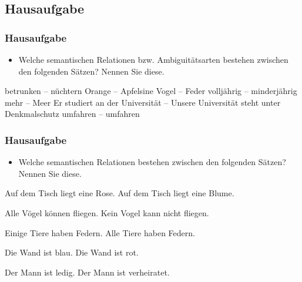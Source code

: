 %
\subsection{Hausaufgabe}
%



\begin{frame}
\frametitle{Hausaufgabe}

\begin{itemize}
	\item Welche semantischen Relationen bzw. Ambiguitätsarten bestehen zwischen den folgenden Sätzen? Nennen Sie diese.
\end{itemize}

\ea 
\ea \label{ex:07HA1} betrunken -- nüchtern
\ex \label{ex:07HA2} Orange -- Apfelsine
\ex \label{ex:07HA3} Vogel -- Feder
\ex \label{ex:07HA4} volljährig -- minderjährig
\ex \label{ex:07HA5} mehr -- Meer
\ex \label{ex:07HA12} Er studiert an der Universität -- Unsere Universität steht unter Denkmalschutz
\ex \label{ex:07HA13} umfahren -- umfahren
\z 	
\z 
\end{frame}



\begin{frame}
\frametitle{Hausaufgabe}

\begin{itemize}
	\item Welche semantischen Relationen bestehen zwischen den folgenden Sätzen? Nennen Sie diese.
\end{itemize}

\ea
	\ea \label{ex:07HA6} Auf dem Tisch liegt eine Rose.
	\ex \label{ex:07HA7} Auf dem Tisch liegt eine Blume.
\z

\ex
	\ea \label{ex:07HA8} Alle Vögel können fliegen.
	\ex \label{ex:07HA9} Kein Vogel kann nicht fliegen.
\z

\ex
	\ea \label{ex:07HA10} Einige Tiere haben Federn.
	\ex \label{ex:07HA11} Alle Tiere haben Federn.
\z

\ex
	\ea \label{ex:07HA14} Die Wand ist blau.
	\ex \label{ex:07HA15} Die Wand ist rot.
\z

\ex
	\ea \label{ex:07HA16} Der Mann ist ledig.
	\ex \label{ex:07HA17} Der Mann ist verheiratet.
\z
\z 
\end{frame}


